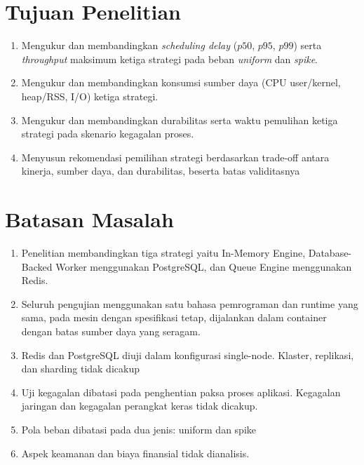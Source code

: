 \section{Tujuan Penelitian} \label{I.Tujuan}
\begin{enumerate}
	\item Mengukur dan membandingkan \textit{scheduling delay} ($p50$, $p95$, $p99$) serta \textit{throughput} maksimum ketiga strategi pada beban \textit{uniform} dan \textit{spike}.
	\item Mengukur dan membandingkan konsumsi sumber daya (CPU user/kernel, heap/RSS, I/O) ketiga strategi.
	\item Mengukur dan membandingkan durabilitas serta waktu pemulihan ketiga strategi pada skenario kegagalan proses.
	\item Menyusun rekomendasi pemilihan strategi berdasarkan trade-off antara kinerja, sumber daya, dan durabilitas, beserta batas validitasnya
\end{enumerate}

\section{Batasan Masalah} \label{I.Batasan}
\begin{enumerate}
	\item Penelitian membandingkan tiga strategi yaitu In-Memory Engine, Database-Backed Worker menggunakan PostgreSQL, dan Queue Engine menggunakan Redis.
	\item Seluruh pengujian menggunakan satu bahasa pemrograman dan runtime yang sama, pada mesin dengan spesifikasi tetap, dijalankan dalam container dengan batas sumber daya yang seragam.
	\item Redis dan PostgreSQL diuji dalam konfigurasi single-node. Klaster, replikasi, dan sharding tidak dicakup
	\item Uji kegagalan dibatasi pada penghentian paksa proses aplikasi. Kegagalan jaringan dan kegagalan perangkat keras tidak dicakup.
	\item Pola beban dibatasi pada dua jenis: uniform dan spike
	\item Aspek keamanan dan biaya finansial tidak dianalisis.
\end{enumerate}

